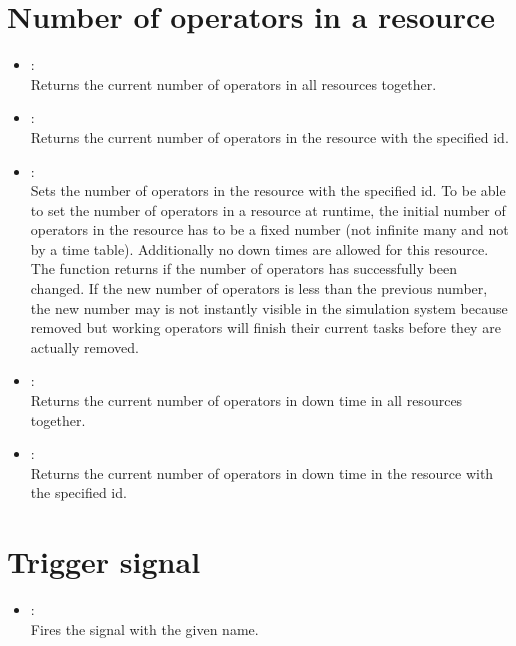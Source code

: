 \section{Number of operators in a resource}

\begin{itemize}

\item
{}:\\
Returns the current number of operators in all resources together.
  
\item
{}:\\
Returns the current number of operators in the resource with the specified id.  
  
\item
{}:\\
Sets the number of operators in the resource with the specified id.
To be able to set the number of operators in a resource at runtime,
the initial number of operators in the resource has to be a fixed number
(not infinite many and not by a time table). Additionally no down times
are allowed for this resource.
The function returns  if the number of operators has successfully 
been changed. If the new number of operators is less than the previous number,
the new number may is not instantly visible in the simulation system because
removed but working operators will finish their current tasks before they are
actually removed.

\item
{}:\\
Returns the current number of operators in down time in all resources together.

\item
{}:\\
Returns the current number of operators in down time in the resource with the specified id.

\end{itemize}

\section{Trigger signal}

\begin{itemize}

\item
{}:\\
Fires the signal with the given name.

\end{itemize}

